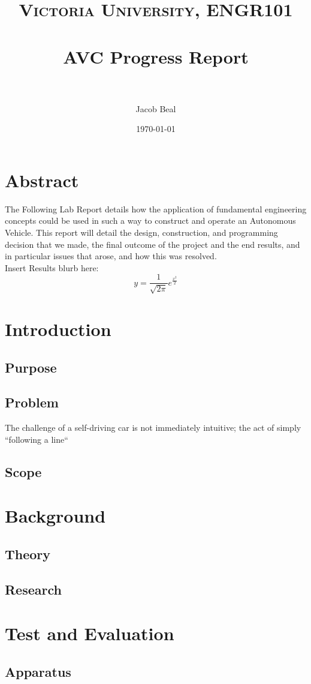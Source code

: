 \documentclass[paper=a4, fontsize=11pt]{scrartcl} %
\title{
\normalfont \normalsize
\textsc{Victoria University, ENGR101} \\ [25pt] %
\horrule{0.5pt} \\[0.4cm] %
\huge AVC Progress Report\\ %
\horrule{2pt} \\[0.5cm] %
}
\author{Jacob Beal} %
\date{\normalsize\today} %
\numberwithin{equation}{section} %
\numberwithin{figure}{section} %
\begin{document}
\maketitle
\tableofcontents
\section{Abstract}
The Following Lab Report details how the application of fundamental engineering
concepts could be used in such a way to construct and operate an Autonomous
Vehicle. This report will detail the design, construction, and programming
decision that we made, the final outcome of the project and the end results,
and in particular issues that arose, and how this was resolved.\\

Insert Results blurb here:\\
$$y=\frac{1}{\sqrt{2\pi}}e^{\frac{x^2}{2}}$$
\section{Introduction}
\subsection{Purpose}
\subsection{Problem}
The challenge of a self-driving car is not immediately intuitive; the act of
simply ``following a line``
\subsection{Scope}
\section{Background}
\subsection{Theory}
\subsection{Research}
\section{Test and Evaluation}
\subsection{Apparatus}
\end{document}
